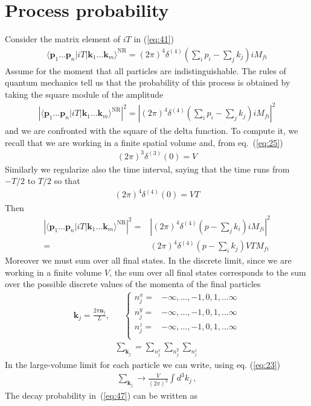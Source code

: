 \section{Process probability}
\label{sec:process-probability}
Consider the matrix element of $i T$ in (\ref{eq:41})
\begin{align}
  \label{eq:45}
  \langle\mathbf{p}_1\ldots\mathbf{p}_n|i T|\mathbf{k}_1\ldots\mathbf{k}_m\rangle^{\text{NR}}=(2\pi)^4\delta^{(4)}\left(\sum_i p_i-\sum_j k_j\right)i{M}_{fi}
\end{align}
Assume for the moment that all particles are indistinguishable. The rules of quantum mechanics  tell us that the probability of this process is obtained by taking the square module of the amplitude 
\begin{align}
   \left|\langle\mathbf{p}_1\ldots\mathbf{p}_n|i T|\mathbf{k}_1\ldots\mathbf{k}_m\rangle^{\text{NR}}\right|^2=
\left|(2\pi)^4\delta^{(4)}\left(\sum_i p_i-\sum_j k_j\right)i {M}_{fi}\right|^2
\end{align}
and we are confronted with the square of the delta function. To compute it, we recall that we are working in a finite spatial volume and, from eq.~(\ref{eq:25})
\begin{align}
  (2\pi)^3\delta^{(3)}(0)=V
\end{align}
Similarly we regularize also the time interval, saying that the time runs from $-T/2$ to $T/2$ so that
\begin{align}
    (2\pi)^4\delta^{(4)}(0)=V T
\end{align}
Then
\begin{align}
\label{eq:47}
     \left|\langle\mathbf{p}_1\ldots\mathbf{p}_n|i T|\mathbf{k}_1\ldots\mathbf{k}_m\rangle^{\text{NR}}\right|^2
     =&\left|(2\pi)^4\delta^{(4)}\left(p-\sum_j k_i\right)i {M}_{fi}\right|^2\nonumber\\
=&(2\pi)^4\delta^{(4)}\left(p-\sum_i k_j\right)V T  {M}_{fi}
\end{align}
Moreover we must sum over all final states. In the discrete limit, since we are
working in a finite volume $V$, the sum over all final states corresponds to  the sum over the possible discrete
values of the momenta of the final particles
\begin{align}
  \mathbf{k}_j=\frac{2\pi\mathbf{n}_j}{L},& &
  \begin{cases}
   n_j^x=& -\infty,\ldots,-1,0,1,\ldots\infty\\
   n_j^y=& -\infty,\ldots,-1,0,1,\ldots\infty\\
   n_j^z=& -\infty,\ldots,-1,0,1,\ldots\infty\\
  \end{cases}
\end{align}
\begin{align}
  \sum_{\mathbf{k}_j}=\sum_{n_j^x}\sum_{n_j^y}\sum_{n_j^z}
\end{align}
In the large-volume limit
for each particle we can write, using eq. (\ref{eq:23})
\begin{align}
  \sum_{\mathbf{k}_j}
\to \frac{V}{(2\pi)^3}  \int d^3k_j\,,
\end{align}
The decay probability in~(\ref{eq:47}) can be written as

